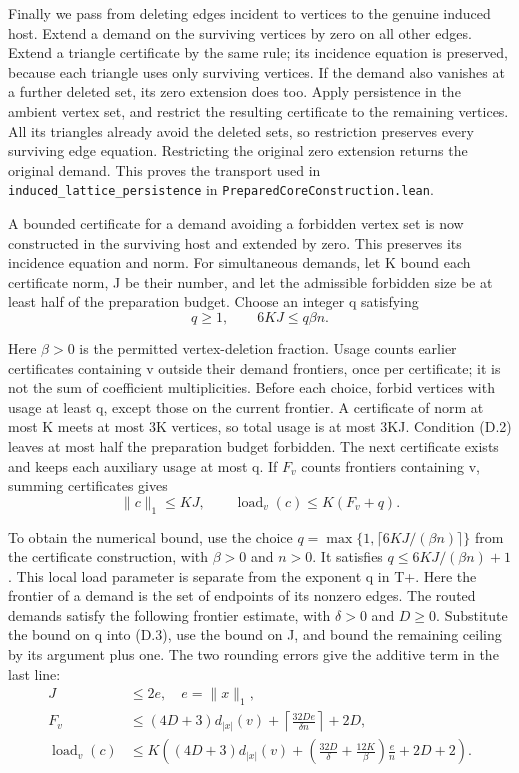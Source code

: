 \documentclass[english,11pt,a4paper]{article}
\begin{document}
Finally we pass from deleting edges incident to vertices to the genuine induced host. Extend a demand on the surviving vertices by zero on all other edges. Extend a triangle certificate by the same rule; its incidence equation is preserved, because each triangle uses only surviving vertices. If the demand also vanishes at a further deleted set, its zero extension does too. Apply persistence in the ambient vertex set, and restrict the resulting certificate to the remaining vertices. All its triangles already avoid the deleted sets, so restriction preserves every surviving edge equation. Restricting the original zero extension returns the original demand. This proves the transport used in \texttt{induced\_\allowbreak{}lattice\_\allowbreak{}persistence} in \texttt{Prepared\allowbreak{}Core\allowbreak{}Construction.\allowbreak{}lean}.

A bounded certificate for a demand avoiding a forbidden vertex set is now constructed in the surviving host and extended by zero. This preserves its incidence equation and norm. For simultaneous demands, let K bound each certificate norm, J be their number, and let the admissible forbidden size be at least half of the preparation budget. Choose an integer q satisfying
\[q\geq1,\qquad 6KJ\leq q\beta n. \tag{D.2}\]

Here \(\beta>0\) is the permitted vertex-deletion fraction. Usage counts earlier certificates containing v outside their demand frontiers, once per certificate; it is not the sum of coefficient multiplicities. Before each choice, forbid vertices with usage at least q, except those on the current frontier. A certificate of norm at most K meets at most 3K vertices, so total usage is at most 3KJ. Condition (D.2) leaves at most half the preparation budget forbidden. The next certificate exists and keeps each auxiliary usage at most q. If \(F_v\) counts frontiers containing v, summing certificates gives
\[\|c\|_1\leq KJ,\qquad \operatorname{load}_v(c)\leq K(F_v+q). \tag{D.3}\]

To obtain the numerical bound, use the choice \(q=\max\{1,\lceil6KJ/(\beta n)\rceil\}\) from the certificate construction, with \(\beta>0\) and \(n>0\). It satisfies \(q\leq6KJ/(\beta n)+1\). This local load parameter is separate from the exponent q in T+. Here the frontier of a demand is the set of endpoints of its nonzero edges. The routed demands satisfy the following frontier estimate, with \(\delta>0\) and \(D\geq0\). Substitute the bound on q into (D.3), use the bound on J, and bound the remaining ceiling by its argument plus one. The two rounding errors give the additive term in the last line:
\[\begin{aligned}J&\leq2e,\quad e=\|x\|_1,\\ F_v&\leq(4D+3)d_{|x|}(v)+\left\lceil\frac{32De}{\delta n}\right\rceil+2D,\\ \operatorname{load}_v(c)&\leq K\left((4D+3)d_{|x|}(v)+\left(\frac{32D}{\delta}+\frac{12K}{\beta}\right)\frac e n+2D+2\right).\end{aligned}\tag{D.4}\]
\end{document}
